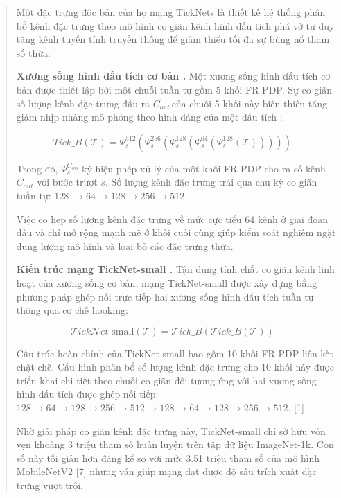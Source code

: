 \documentclass[
  12pt,
  a4paper,
]{report}
\begin{document}
\begin{quote}
Một đặc trưng độc bản của họ mạng TickNets là thiết kế hệ thống phân bổ
kênh đặc trưng theo mô hình co giãn kênh hình dấu tích phá vỡ tư duy
tăng kênh tuyến tính truyền thống để giảm thiểu tối đa sự bùng nổ tham
số thừa.

\textbf{Xương sống hình dấu tích cơ bản .} Một xương sống hình dấu tích
cơ bản được thiết lập bởi một chuỗi tuần tự gồm 5 khối FR-PDP. Sự co
giãn số lượng kênh đặc trưng đầu ra \(C_{out\ }\)của chuỗi 5 khối này
biến thiên tăng giảm nhịp nhàng mô phỏng theo hình dáng của một dấu tích
:

\[Tick\_ B\left( \mathcal{T} \right) = \Psi_{s}^{512}\left( \Psi_{s}^{256}\left( \Psi_{s}^{128}\left( \Psi_{s}^{64}\left( \Psi_{s}^{128}\left( \mathcal{T} \right) \right) \right) \right) \right)\quad\]

Trong đó, \(\Psi_{s}^{C_{out}}\ \)ký hiệu phép xử lý của một khối FR-PDP
cho ra số kênh \(C_{out}\) với bước trượt \(s\). Số lượng kênh đặc trưng
trải qua chu kỳ co giãn tuần tự:
\(128\  \rightarrow 64 \rightarrow 128 \rightarrow 256 \rightarrow 512\).

Việc co hẹp số lượng kênh đặc trưng về mức cực tiểu 64 kênh ở giai đoạn
đầu và chỉ mở rộng mạnh mẽ ở khối cuối cùng giúp kiểm soát nghiêm ngặt
dung lượng mô hình và loại bỏ các đặc trưng thừa.

\textbf{Kiến trúc mạng TickNet-small .} Tận dụng tính chất co giãn kênh
linh hoạt của xương sống cơ bản, mạng TickNet-small được xây dựng bằng
phương pháp ghép nối trực tiếp hai xương sống hình dấu tích tuần tự
thông qua cơ chế hooking:

\[\mathcal{T}ick\mathcal{N}et\text{-small}\left( \mathcal{T} \right) = \mathcal{T}ick\_ B\left( \mathcal{T}ick\_ B\left( \mathcal{T} \right) \right)\quad\]

Cấu trúc hoàn chỉnh của TickNet-small bao gồm 10 khối FR-PDP liên kết
chặt chẽ. Cấu hình phân bổ số lượng kênh đặc trưng cho 10 khối này được
triển khai chi tiết theo chuỗi co giãn đôi tương ứng với hai xương sống
hình dấu tích được ghép nối tiếp:
\(128 \rightarrow 64 \rightarrow 128 \rightarrow 256 \rightarrow 512 \rightarrow 128 \rightarrow 64 \rightarrow 128 \rightarrow 256 \rightarrow 512\).
{[}1{]}

Nhờ giải pháp co giãn kênh đặc trưng này, TickNet-small chỉ sở hữu vỏn
vẹn khoảng 3 triệu tham số huấn luyện trên tập dữ liệu ImageNet-1k. Con
số này tối giản hơn đáng kể so với mức 3.51 triệu tham số của mô hình
MobileNetV2 {[}7{]} nhưng vẫn giúp mạng đạt được độ sâu trích xuất đặc
trưng vượt trội.
\end{quote}
\end{document}
